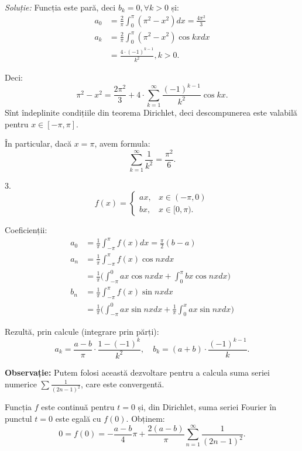 \documentclass[11pt,a4paper]{article}
\theoremstyle{dotless}
\theoremstyle{dotlessdr}
\begin{document}
\emph{Soluție:} Funcția este pară, deci $b_k = 0, \forall k > 0$ și:
\begin{align*}
  a_0 &= \frac{2}{\pi} \int_0^{\pi} (\pi^2 - x^2) dx = \frac{4\pi^2}{3} \\
  a_k &= \frac{2}{\pi} \int_0^{\pi} (\pi^2 - x^2) \cos kx dx \\
      &= \frac{4 \cdot (-1)^{k - 1}}{k^2}, k > 0.
\end{align*}

Deci:
\[
  \pi^2 - x^2 = \frac{2\pi^2}{3} + 4 \cdot \sum_{k = 1}^\infty \frac{(-1)^{k-1}}{k^2} \cos kx.
\]
Sînt îndeplinite condițiile din teorema Dirichlet, deci descompunerea este
valabilă pentru $x \in [-\pi, \pi]$.

În particular, dacă $x = \pi$, avem formula:
\[
  \sum_{k = 1}^\infty \frac{1}{k^2} = \frac{\pi^2}{6}.
\]

\vspace{1cm}

3.
\[
  f(x) =
  \begin{cases}
    ax, & x \in (-\pi, 0) \\
    bx, & x \in [0, \pi).
  \end{cases}
\]

Coeficienții:
\begin{align*}
  a_0 &= \frac{1}{\pi} \int_{-\pi}^\pi f(x) dx = \frac{\pi}{2} (b - a) \\
  a_n &= \frac{1}{\pi} \int_{-\pi}^\pi f(x) \cos nx dx \\
      &= \frac{1}{\pi} \Big( \int_{-\pi}^0 ax \cos nx dx + \int_0^\pi bx \cos nx dx \Big) \\
  b_n &= \frac{1}{\pi} \int_{-\pi}^\pi f(x) \sin nx dx \\
      &= \frac{1}{\pi} \Big( \int_{-\pi}^0 ax \sin nx dx + \frac{1}{\pi} \int_0^x ax \sin nx dx \Big)
\end{align*}

Rezultă, prin calcule (integrare prin părți):
\[
  a_k = \frac{a - b}{\pi} \cdot \frac{1 - (-1)^k}{k^2}, \quad
  b_k = (a + b) \cdot \frac{(-1)^{k - 1}}{k}.
\]

\textbf{Observație:} Putem folosi această dezvoltare pentru a calcula suma
seriei numerice $\sum \frac{1}{(2n - 1)^2}$, care este convergentă.

Funcția $f$ este continuă pentru $t = 0$ și, din Dirichlet, suma seriei Fourier
în punctul $t = 0$ este egală cu $f(0)$. Obținem:
\[
  0 = f(0) = - \frac{a - b}{4} \pi + \frac{2(a - b)}{\pi}
  \sum_{n = 1}^\infty \frac{1}{(2n - 1)^2}.
\]
\end{document}
